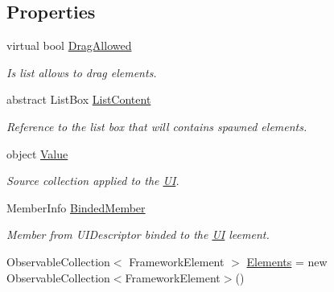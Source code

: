\subsection*{Properties}
\begin{DoxyCompactItemize}
\item 
virtual bool \mbox{\hyperlink{class_wpf_handler_1_1_u_i_1_1_controls_1_1_collection_control_a93748b307999d44bfa539f0a799af1de}{Drag\+Allowed}}
\begin{DoxyCompactList}\small\item\em Is list allows to drag elements. \end{DoxyCompactList}\item 
abstract List\+Box \mbox{\hyperlink{class_wpf_handler_1_1_u_i_1_1_controls_1_1_collection_control_af98966a5a52deff891275181f1a82b17}{List\+Content}}
\begin{DoxyCompactList}\small\item\em Reference to the list box that will contains spawned elements. \end{DoxyCompactList}\item 
object \mbox{\hyperlink{class_wpf_handler_1_1_u_i_1_1_controls_1_1_collection_control_a130ec8fe8e45683069833138833e9356}{Value}}
\begin{DoxyCompactList}\small\item\em Source collection applied to the \mbox{\hyperlink{namespace_wpf_handler_1_1_u_i}{UI}}. \end{DoxyCompactList}\item 
Member\+Info \mbox{\hyperlink{class_wpf_handler_1_1_u_i_1_1_controls_1_1_collection_control_ac5f779f05470058d2506b4f37cade718}{Binded\+Member}}
\begin{DoxyCompactList}\small\item\em Member from U\+I\+Descriptor binded to the \mbox{\hyperlink{namespace_wpf_handler_1_1_u_i}{UI}} leement. \end{DoxyCompactList}\item 
Observable\+Collection$<$ Framework\+Element $>$ \mbox{\hyperlink{class_wpf_handler_1_1_u_i_1_1_controls_1_1_collection_control_ade5772e31978f3f8764f50d7483d27f4}{Elements}} = new Observable\+Collection$<$Framework\+Element$>$()

\end{DoxyCompactItemize}
